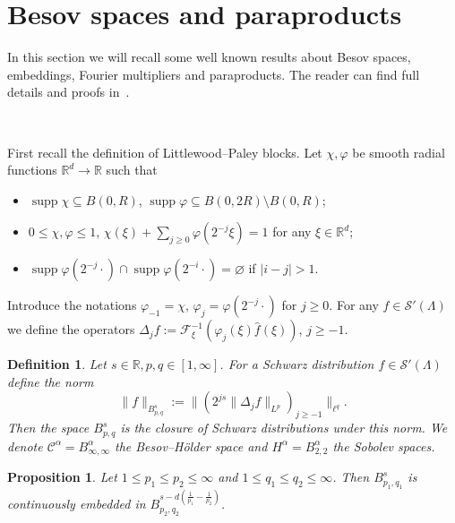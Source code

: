 \documentclass[11pt]{article}
\newcommand{\assign}{:=}
\newcommand{\tmop}[1]{\ensuremath{\operatorname{#1}}}
\newtheorem{definition}{Definition}
\newtheorem{proposition}{Proposition}
{\theorembodyfont{\rmfamily}\newtheorem{remark}{Remark}}
\newcommand{\VV}{\mathscr{C}}
\newcommand{\CF}{\mathscr{F}}
\newcommand{\CS}{\mathscr{S}}
\begin{document}
\appendix\section{Besov spaces and paraproducts}\label{sec:appendix-para}

In this section we will recall some well known results about Besov spaces,
embeddings, Fourier multipliers and paraproducts. The reader can find full
details and proofs
in~{\cite{bahouri_fourier_2011,gubinelli_paracontrolled_2015}}.

\

First recall the definition of Littlewood--Paley blocks. Let $\chi, \varphi$
be smooth radial functions $\mathbb{R}^d \rightarrow \mathbb{R}$ such that
\begin{itemize}
  \item $\tmop{supp} \chi \subseteq B (0, R)$, $\tmop{supp} \varphi \subseteq
  B (0, 2 R) \setminus B (0, R)$;
  
  \item $0 \leqslant \chi, \varphi \leqslant 1$, $\chi (\xi) + \sum_{j \geq 0}
  \varphi (2^{- j} \xi) = 1$ for any $\xi \in \mathbb{R}^d$;
  
  \item $\tmop{supp} \varphi (2^{- j} \cdot) \cap \tmop{supp} \varphi (2^{- i}
  \cdot) = \varnothing$ if $| i - j | > 1$.
\end{itemize}
Introduce the notations $\varphi_{- 1} = \chi$, $\varphi_j = \varphi (2^{- j}
\cdot)$ for $j \geqslant 0$. For any $f \in \CS' (\Lambda)$ we define the
operators $\Delta_j f \assign \mathcal{\CF}^{- 1}_{\xi} (\varphi_j (\xi)
\hat{f} (\xi))$, $j \geqslant - 1$.

\begin{definition}
  Let $s \in \mathbb{R}, p, q \in [1, \infty]$. For a Schwarz distribution $f
  \in \CS' (\Lambda)$ define the norm
  \[ \| f \|_{B_{p, q}^s} \assign \| (2^{j s} \| \Delta_j f \|_{L^p})_{j
     \geqslant - 1} \|_{\ell^q} . \]
  Then the space $B^s_{p, q}$ is the closure of Schwarz distributions under
  this norm. We denote $\VV^{\alpha} = B_{\infty, \infty}^{\alpha}$ the
  Besov--H{\"o}lder space and $H^{\alpha} = B^{\alpha}_{2, 2}$ the Sobolev
  spaces. \ 
\end{definition}

\begin{proposition}
  \label{besovembedding1}Let $1 \leqslant p_1 \leqslant p_2 \leqslant \infty$
  and $1 \leqslant q_1 \leqslant q_2 \leqslant \infty$. Then $B^s_{p_1, q_1}$
  is continuously embedded in $B_{p_2, q_2}^{s - d \left( \frac{1}{p_1} -
  \frac{1}{p_2} \right)}$.
\end{proposition}
\end{document}
